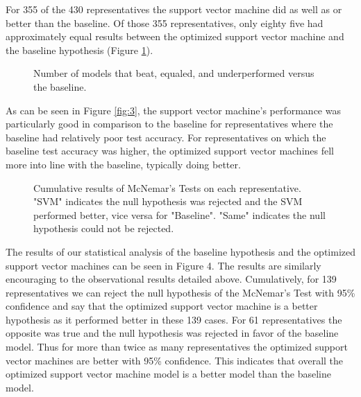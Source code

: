 \documentclass[11pt,letterpaper,twocolumn]{article}
\begin{document}
For 355 of the 430 representatives the support vector machine did as well as or better than the baseline. Of those 355 representatives, only eighty five had approximately equal results between the optimized support vector machine and the baseline hypothesis (Figure \ref{fig:2}).


\begin{figure}
\centering
{}
\caption{Number of models that beat, equaled, and underperformed versus the baseline.}
\label{fig:2}
\end{figure}

As can be seen in Figure \ref{fig:3}, the support vector machine's performance was particularly good in comparison to the baseline for representatives where the baseline had relatively poor test accuracy. For representatives on which the baseline test accuracy was higher, the optimized support vector machines fell more into line with the baseline, typically doing better.

\begin{figure}
\centering
{}
\caption{Cumulative results of McNemar's Tests on each representative. "SVM" indicates the null hypothesis was rejected and the SVM performed better, vice versa for "Baseline". "Same" indicates the null hypothesis could not be rejected.}
\end{figure}

The results of our statistical analysis of the baseline hypothesis and the optimized support vector machines can be seen in Figure 4. The results are similarly encouraging to the observational results detailed above. Cumulatively, for 139 representatives we can reject the null hypothesis of the McNemar's Test with 95\% confidence and say that the optimized support vector machine is a better hypothesis as it performed better in these 139 cases. For 61 representatives the opposite was true and the null hypothesis was rejected in favor of the baseline model. Thus for more than twice as many representatives the optimized support vector machines are better with 95\% confidence. This indicates that overall the optimized support vector machine model is a better model than the baseline model.
\end{document}
